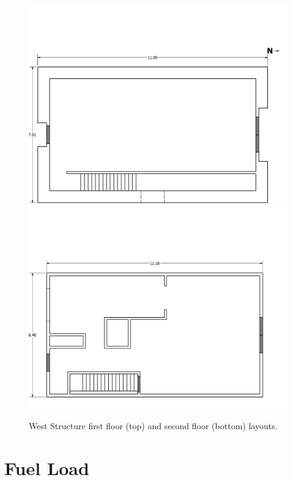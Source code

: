 \documentclass[12pt,oneside]{book}
\begin{document}
\clearpage

\begin{figure}[!ht]
\includegraphics[width=6in]{../../Drawings/PDFs/Without_Intrumentation/West_Structure_1st_Floor_Metric_Simple}
\\
\includegraphics[width=6in]{../../Drawings/PDFs/Without_Intrumentation/West_Structure_2nd_Floor_Metric_Simple}
\caption{West Structure first floor (top) and second floor (bottom) layouts.}
\label{fig:west_general_plan}
\end{figure}

\clearpage
\section{Fuel Load}
\end{document}
